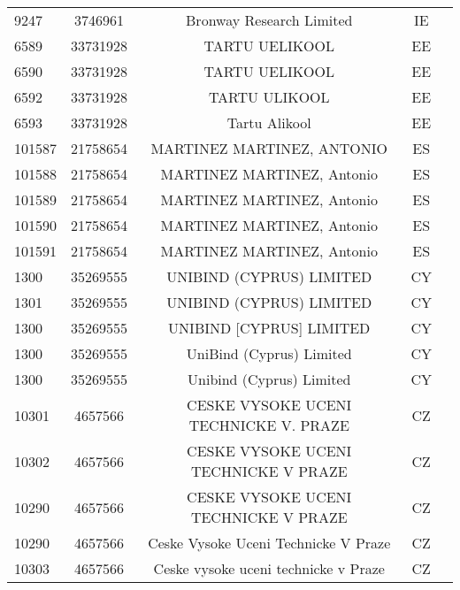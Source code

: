 \begin{longtable}{|l|c|c|c|c|}
      9247 &    3746961 &                           Bronway Research Limited &      IE \\
      6589 &   33731928 &                                     TARTU UELIKOOL &      EE \\
      6590 &   33731928 &                                     TARTU UELIKOOL &      EE \\
      6592 &   33731928 &                                      TARTU ULIKOOL &      EE \\
      6593 &   33731928 &                                      Tartu Alikool &      EE \\
    101587 &   21758654 &                         MARTINEZ MARTINEZ, ANTONIO &      ES \\
    101588 &   21758654 &                         MARTINEZ MARTINEZ, Antonio &      ES \\
    101589 &   21758654 &                         MARTINEZ MARTINEZ, Antonio &      ES \\
    101590 &   21758654 &                         MARTINEZ MARTINEZ, Antonio &      ES \\
    101591 &   21758654 &                         MARTINEZ MARTINEZ, Antonio &      ES \\
      1300 &   35269555 &                           UNIBIND (CYPRUS) LIMITED &      CY \\
      1301 &   35269555 &                           UNIBIND (CYPRUS) LIMITED &      CY \\
      1300 &   35269555 &                           UNIBIND [CYPRUS] LIMITED &      CY \\
      1300 &   35269555 &                           UniBind (Cyprus) Limited &      CY \\
      1300 &   35269555 &                           Unibind (Cyprus) Limited &      CY \\
     10301 &    4657566 &              CESKE VYSOKE UCENI TECHNICKE V. PRAZE &      CZ \\
     10302 &    4657566 &               CESKE VYSOKE UCENI TECHNICKE V PRAZE &      CZ \\
     10290 &    4657566 &               CESKE VYSOKE UCENI TECHNICKE V PRAZE &      CZ \\
     10290 &    4657566 &               Ceske Vysoke Uceni Technicke V Praze &      CZ \\
     10303 &    4657566 &               Ceske vysoke uceni technicke v Praze &      CZ \\

\end{longtable}
